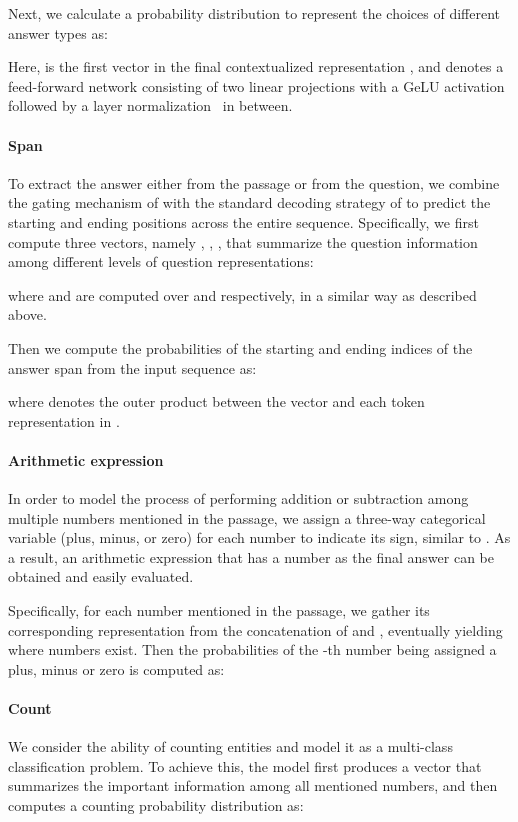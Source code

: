 \documentclass[11pt,a4paper]{article}
\begin{document}
Next, we calculate a probability distribution to represent the choices of different answer types as:

Here,  is the first vector in the final contextualized representation , and  denotes a feed-forward network consisting of two linear projections with a GeLU activation~\cite{hendrycks2016bridging} followed by a layer normalization~\cite{lei2016layer} in between.

\paragraph{Span}
To extract the answer either from the passage or from the question, we combine the gating mechanism of \citet{wang2017gated} with the standard decoding strategy of \citet{seo2016bidirectional} to predict the starting and ending positions across the entire sequence.
Specifically, we first compute three vectors, namely , , , that summarize the question information among different levels of question representations:

where  and  are computed over  and  respectively, in a similar way as described above.

Then we compute the probabilities of the starting and ending indices of the answer span from the input sequence as:

where  denotes the outer product between the vector  and each token representation in .

\paragraph{Arithmetic expression} 
In order to model the process of performing addition or subtraction among multiple numbers mentioned in the passage, we assign a three-way categorical variable (plus, minus, or zero) for each number to indicate its sign, similar to \citet{dua2019drop}. 
As a result, an arithmetic expression that has a number as the final answer can be obtained and easily evaluated.

Specifically, for each number mentioned in the passage, we gather its corresponding representation from the concatenation of  and , eventually yielding  where  numbers exist. 
Then the probabilities of the -th number being assigned a plus, minus or zero is computed as:


\paragraph{Count} 
We consider the ability of counting entities and model it as a multi-class classification problem. 
To achieve this, the model first produces a vector  that summarizes the important information among all mentioned numbers, and then computes a counting probability distribution as:
\end{document}

